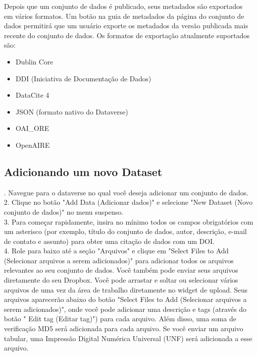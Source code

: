 \documentclass[12pt,hidelinks]{article}
\begin{document}
\qquad Depois que um conjunto de dados é publicado, seus metadados são exportados em vários formatos. Um botão na guia de metadados da página do conjunto de dados permitirá que um usuário exporte os metadados da versão publicada mais recente do conjunto de dados. Os formatos de exportação atualmente suportados são:

\begin{itemize}

 \item Dublin Core
 \item DDI (Iniciativa de Documentação de Dados)
 \item DataCite 4
 \item JSON (formato nativo do Dataverse)
 \item OAI\_ORE
 \item OpenAIRE

\end{itemize}
        
    \subsection{Adicionando um novo Dataset}
    
. Navegue para o dataverse no qual você deseja adicionar um conjunto de dados.\\

2. Clique no botão "Add Data (Adicionar dados)" e selecione "New Dataset (Novo conjunto de dados)" no menu suspenso.\\

3. Para começar rapidamente, insira no mínimo todos os campos obrigatórios com um asterisco (por exemplo, título do conjunto de dados, autor, descrição, e-mail de contato e assunto) para obter uma citação de dados com um DOI.\\

4. Role para baixo até a seção "Arquivos" e clique em "Select Files to Add (Selecionar arquivos a serem adicionados)" para adicionar todos os arquivos relevantes ao seu conjunto de dados. Você também pode enviar seus arquivos diretamente do seu Dropbox. Você pode arrastar e soltar ou selecionar vários arquivos de uma vez da área de trabalho diretamente no widget de upload. Seus arquivos aparecerão abaixo do botão "Select Files to Add (Selecionar arquivos a serem adicionados)", onde você pode adicionar uma descrição e tags (através do botão " Edit tag (Editar tag)") para cada arquivo. Além disso, uma soma de verificação MD5 será adicionada para cada arquivo. Se você enviar um arquivo tabular, uma Impressão Digital Numérica Universal (UNF) será adicionada a esse arquivo.\\
\end{document}
